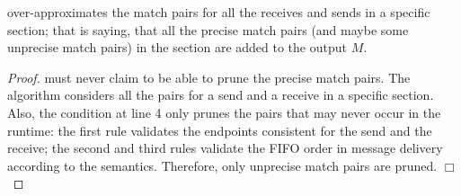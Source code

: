 \begin{lemma}
 over-approximates the match pairs for all the receives and sends in a specific section; that is saying, that all the precise match pairs (and maybe some unprecise match pairs) in the section are added to the output $M$.
\end{lemma}
\begin{proof}
 must never claim to be able to prune the precise match pairs. The algorithm considers all the pairs for a send and a receive in a specific section. Also, the condition at line 4 only prunes the pairs that may never occur in the runtime: the first rule validates the endpoints consistent for the send and the receive; the second and third rules validate the FIFO order in message delivery according to the semantics. Therefore, only unprecise match pairs are pruned. $\Box$
\end{proof}


